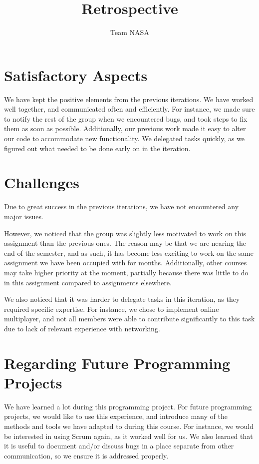 \documentclass[12pt, a4paper]{article}
\title{Retrospective}
\author{Team NASA}
\date{}
\begin{document}
\maketitle


\section*{Satisfactory Aspects}
We have kept the positive elements from the previous iterations. We have worked well together, and communicated often and efficiently. For instance, we made sure to notify the rest of the group when we encountered bugs, and took steps to fix them as soon as possible. Additionally, our previous work made it easy to alter our code to accommodate new functionality. We delegated tasks quickly, as we figured out what needed to be done early on in the iteration.

\section*{Challenges}
Due to great success in the previous iterations, we have not encountered any major issues. 

However, we noticed that the group was slightly less motivated to work on this assignment than the previous ones. The reason may be that we are nearing the end of the semester, and as such, it has become less exciting to work on the same assignment we have been occupied with for months. Additionally, other courses may take higher priority at the moment, partially because there was little to do in this assignment compared to assignments elsewhere.

We also noticed that it was harder to delegate tasks in this iteration, as they required specific expertise. For instance, we chose to implement online multiplayer, and not all members were able to contribute significantly to this task due to lack of relevant experience with networking.

\section*{Regarding Future Programming Projects}
We have learned a lot during this programming project. For future programming projects, we would like to use this experience, and introduce many of the methods and tools we have adapted to during this course. For instance, we would be interested in using Scrum again, as it worked well for us. We also learned that it is useful to document and/or discuss bugs in a place separate from other communication, so we ensure it is addressed properly.
\end{document}
